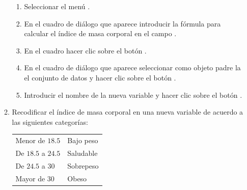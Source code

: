 \begin{enumerate}[leftmargin=*]
\begin{enumerate}
\begin{indicacion}
\begin{enumerate}
\item Seleccionar el menú .
\item En el cuadro de diálogo que aparece introducir la fórmula para calcular el índice de masa
corporal en el campo .
\item En el cuadro  hacer clic sobre el botón .
\item En el cuadro de diálogo que aparece seleccionar como objeto padre la el conjunto de datos  y hacer clic sobre el botón .
\item Introducir el nombre de la nueva variable  y hacer clic sobre el botón .
\end{enumerate}
\end{indicacion}

\item Recodificar el índice de masa corporal en una nueva variable de acuerdo a las siguientes categorías:
\begin{center}
\begin{tabular}{ll}
Menor de $18.5$ & Bajo peso\\
De $18.5$ a $24.5$ & Saludable\\
De $24.5$ a $30$ & Sobrepeso\\
Mayor de $30$  & Obeso
\end{tabular}
\end{center}


\end{enumerate}
\end{enumerate}
